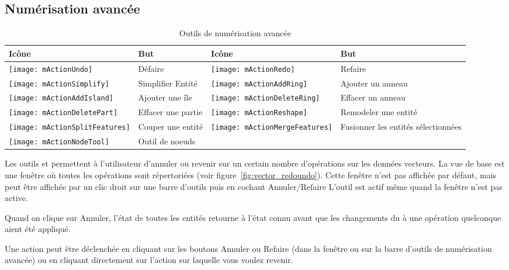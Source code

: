 \subsection{Numérisation avancée}
\label{sec:advanced_edit}

\begin{table}[h]
\centering
\begin{tabular}{|l|p{5.5cm}|l|p{5.5cm}|}
\hline \textbf{Icône} & \textbf{But} & \textbf{Icône} & \textbf{But} \\
\hline \texttt{[image: mActionUndo]}
   & Défaire 
   & \texttt{[image: mActionRedo]}
   & Refaire \\
\hline \texttt{[image: mActionSimplify]}
   & Simplifier Entité
   & \texttt{[image: mActionAddRing]}
   & Ajouter un anneau \\
\hline \texttt{[image: mActionAddIsland]}
   & Ajouter une île
   & \texttt{[image: mActionDeleteRing]}
   & Effacer un anneau \\
\hline \texttt{[image: mActionDeletePart]}
   & Effacer une partie
   & \texttt{[image: mActionReshape]}
   & Remodeler une entité \\
\hline \texttt{[image: mActionSplitFeatures]}
   & Couper une entité
   & \texttt{[image: mActionMergeFeatures]}
   & Fusionner les entités sélectionnées \\
\hline \texttt{[image: mActionNodeTool]}
   & Outil de noeuds
   &
   & \\
\hline
\end{tabular}
\caption{Outils de numérisation avancée}\label{tab:advanced_editing}
\end{table}


Les outils  et  permettent à l'utilisateur d'annuler ou revenir sur un certain nombre d'opérations sur les données vecteurs. La vue de base est une fenêtre où toutes les opérations sont répertoriées (voir figure~\ref{fig:vector_redoundo}). Cette fenêtre n'est pas affichée par défaut, mais peut être affichée par un clic droit sur une barre d'outils puis en cochant Annuler/Refaire L'outil est actif même quand la fenêtre n'est pas active.
\par
Quand on clique sur Annuler, l'état de toutes les entités retourne à l'état connu avant que les changements du à une opération quelconque aient été appliqué.
\par
Une action peut être déclenchée en cliquant sur les boutons Annuler ou Refaire (dans la fenêtre ou sur la barre d'outils de numérisation avancée) ou en cliquant directement sur l'action sur laquelle vous voulez revenir.

